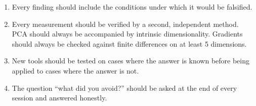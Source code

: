 \documentclass[11pt]{article}
\begin{document}
\begin{enumerate}
\item Every finding should include the conditions under which it would be falsified.
\item Every measurement should be verified by a second, independent method. PCA should always be accompanied by intrinsic dimensionality. Gradients should always be checked against finite differences on at least 5 dimensions.
\item New tools should be tested on cases where the answer is known before being applied to cases where the answer is not.
\item The question ``what did you avoid?'' should be asked at the end of every session and answered honestly.
\end{enumerate}
\end{document}
